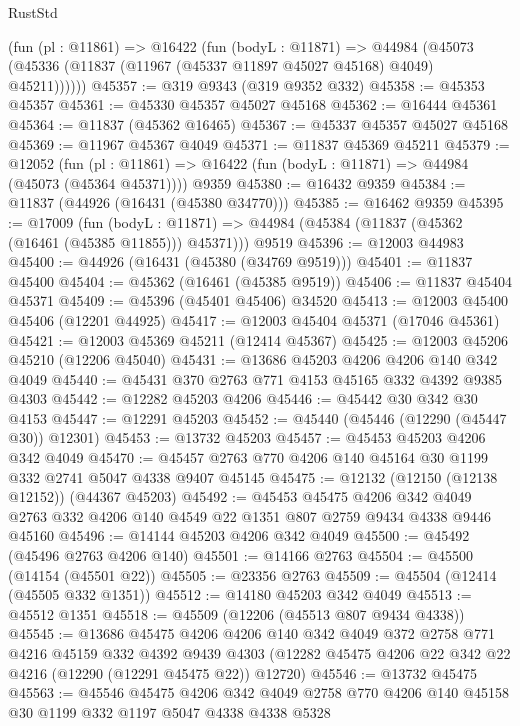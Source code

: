 \begin{lexlean}{RustStd}
\begin{coremodule}
      (fun (pl : @11861) =>
      @16422
        (fun (bodyL : @11871) =>
        @44984 (@45073 (@45336 (@11837 (@11967 (@45337 @11897 @45027 @45168) @4049) @45211))))))
@45357 := @319 @9343 (@319 @9352 @332)
@45358 := @45353 @45357
@45361 := @45330 @45357 @45027 @45168
@45362 := @16444 @45361
@45364 := @11837 (@45362 @16465)
@45367 := @45337 @45357 @45027 @45168
@45369 := @11967 @45367 @4049
@45371 := @11837 @45369 @45211
@45379 := @12052
    (fun (pl : @11861) => @16422 (fun (bodyL : @11871) => @44984 (@45073 (@45364 @45371))))
    @9359
@45380 := @16432 @9359
@45384 := @11837 (@44926 (@16431 (@45380 @34770)))
@45385 := @16462 @9359
@45395 := @17009
    (fun (bodyL : @11871) => @44984 (@45384 (@11837 (@45362 (@16461 (@45385 @11855))) @45371)))
    @9519
@45396 := @12003 @44983
@45400 := @44926 (@16431 (@45380 (@34769 @9519)))
@45401 := @11837 @45400
@45404 := @45362 (@16461 (@45385 @9519))
@45406 := @11837 @45404 @45371
@45409 := @45396 (@45401 @45406) @34520
@45413 := @12003 @45400 @45406 (@12201 @44925)
@45417 := @12003 @45404 @45371 (@17046 @45361)
@45421 := @12003 @45369 @45211 (@12414 @45367)
@45425 := @12003 @45206 @45210 (@12206 @45040)
@45431 := @13686 @45203 @4206 @4206 @140 @342 @4049
@45440 := @45431 @370 @2763 @771 @4153 @45165 @332 @4392 @9385 @4303
@45442 := @12282 @45203 @4206
@45446 := @45442 @30 @342 @30 @4153
@45447 := @12291 @45203
@45452 := @45440 (@45446 (@12290 (@45447 @30)) @12301)
@45453 := @13732 @45203
@45457 := @45453 @45203 @4206 @342 @4049
@45470 := @45457 @2763 @770 @4206 @140 @45164 @30 @1199 @332 @2741 @5047 @4338 @9407 @45145
@45475 := @12132 (@12150 (@12138 @12152)) (@44367 @45203)
@45492 := @45453
    @45475
    @4206
    @342
    @4049
    @2763
    @332
    @4206
    @140
    @4549
    @22
    @1351
    @807
    @2759
    @9434
    @4338
    @9446
    @45160
@45496 := @14144 @45203 @4206 @342 @4049
@45500 := @45492 (@45496 @2763 @4206 @140)
@45501 := @14166 @2763
@45504 := @45500 (@14154 (@45501 @22))
@45505 := @23356 @2763
@45509 := @45504 (@12414 (@45505 @332 @1351))
@45512 := @14180 @45203 @342 @4049
@45513 := @45512 @1351
@45518 := @45509 (@12206 (@45513 @807 @9434 @4338))
@45545 := @13686
    @45475
    @4206
    @4206
    @140
    @342
    @4049
    @372
    @2758
    @771
    @4216
    @45159
    @332
    @4392
    @9439
    @4303
    (@12282 @45475 @4206 @22 @342 @22 @4216 (@12290 (@12291 @45475 @22)) @12720)
@45546 := @13732 @45475
@45563 := @45546
    @45475
    @4206
    @342
    @4049
    @2758
    @770
    @4206
    @140
    @45158
    @30
    @1199
    @332
    @1197
    @5047
    @4338
    @4338
    @5328

\end{coremodule}
\end{lexlean}

